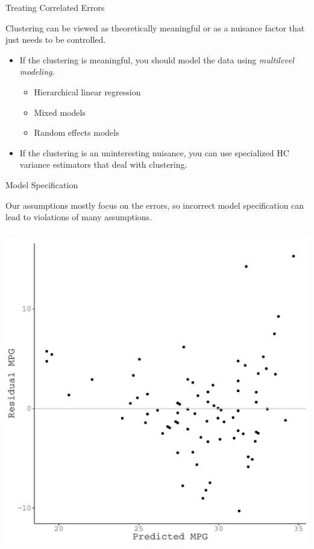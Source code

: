 \documentclass[10pt]{beamer}\usepackage[]{graphicx}\usepackage[]{color}
\makeatletter
\def\maxwidth{ %
  \ifdim\Gin@nat@width>\linewidth
    \linewidth
  \else
    \Gin@nat@width
  \fi
}
\newenvironment{knitrout}{}{} %
\makeatother
\begin{document}
{\begin{frame}[allowframebreaks]{Treating Correlated Errors}
  \pagebreak

  Clustering can be viewed as theoretically meaningful or as a nuisance factor
  that just needs to be controlled.
  \vb
  \begin{itemize}
  \item If the clustering is meaningful, you should model the data using
    \emph{multilevel modeling}.
    \vc
    \begin{itemize}
    \item Hierarchical linear regression
      \vc
    \item Mixed models
      \vc
    \item Random effects models
    \end{itemize}
    \vc
  \item If the clustering is an uninteresting nuisance, you can use specialized
    HC variance estimators that deal with clustering.
  \end{itemize}

\end{frame}

\watermarkoff %

\begin{frame}{Model Specification}

  Our assumptions mostly focus on the errors, so incorrect model specification
  can lead to violations of many assumptions.
  \vb
  \begin{columns}
    \begin{column}{0.5\textwidth}

\begin{knitrout}\footnotesize
{}\color{fgcolor}

{\centering \includegraphics[width=\maxwidth]{figure/assumptions-unnamed-chunk-11-1} 

}
\end{knitrout}
\end{column}
\end{columns}
\end{frame}}
\end{document}

